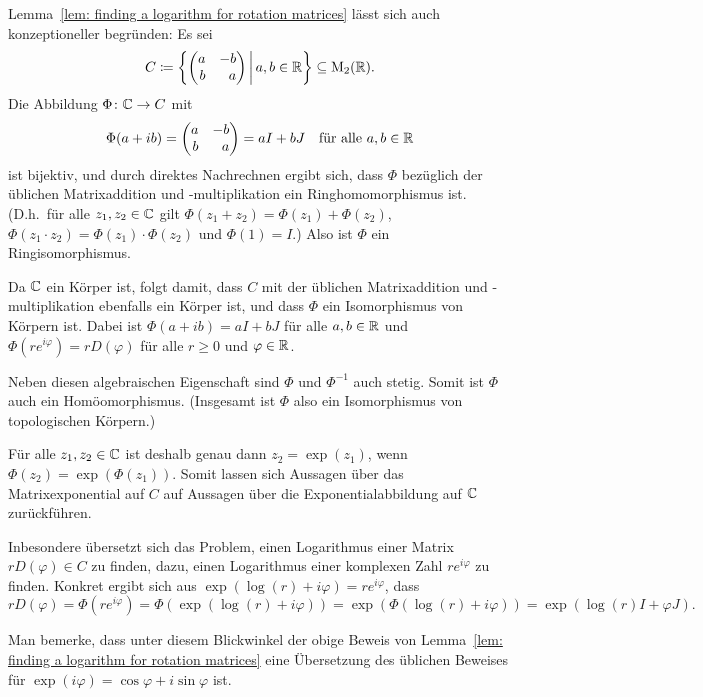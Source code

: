 \documentclass[a4paper, 10pt, numbers=noenddot]{scrartcl}
\begin{document}
\begin{remark}
  Lemma~\ref{lem: finding a logarithm for rotation matrices} lässt sich auch konzeptioneller begründen:
  Es sei
  \[
    C \coloneqq
    \left\{
      \begin{pmatrix*}[r]
        a & -b  \\
        b &  a
      \end{pmatrix*}
    \,\middle|\,
      a, b \in \Rbb
    \right\}
    \subseteq
    \Mat_2(\Rbb).
  \]
  Die Abbildung $\Phi \colon \mathbb{C} \to C$ mit
  \[
    \Phi(a + i b)
    =
    \begin{pmatrix*}[r]
      a & -b  \\
      b &  a
    \end{pmatrix*}
    =
    a I + b J
    \quad
    \text{für alle $a, b \in \Rbb$}
  \]
  ist bijektiv, und durch direktes Nachrechnen ergibt sich, dass $\Phi$ bezüglich der üblichen Matrixaddition und -multiplikation ein Ringhomomorphismus ist. (D.h.\ für alle $z_1, z_2 \in \mathbb{C}$ gilt $\Phi(z_1 + z_2) = \Phi(z_1) + \Phi(z_2)$, $\Phi(z_1 \cdot z_2) = \Phi(z_1) \cdot \Phi(z_2)$ und $\Phi(1) = I$.)
  Also ist $\Phi$ ein Ringisomorphismus.
  
  Da $\mathbb{C}$ ein Körper ist, folgt damit, dass $C$ mit der üblichen Matrixaddition und -multi\-pli\-ka\-ti\-on ebenfalls ein Körper ist, und dass $\Phi$ ein Isomorphismus von Körpern ist.
  Dabei ist $\Phi(a + ib) = a I + b J$ für alle $a, b \in \mathbb{R}$ und $\Phi(r e^{i\varphi}) = r D(\varphi)$ für alle $r \geq 0$ und $\varphi \in \mathbb{R}$.
  
  Neben diesen algebraischen Eigenschaft sind $\Phi$ und $\Phi^{-1}$ auch stetig.
  Somit ist $\Phi$ auch ein Homöomorphismus.
  (Insgesamt ist $\Phi$ also ein Isomorphismus von topologischen Körpern.)
  
  Für alle $z_1, z_2 \in \mathbb{C}$ ist deshalb genau dann $z_2 = \exp(z_1)$, wenn $\Phi(z_2) = \exp(\Phi(z_1))$.
  Somit lassen sich Aussagen über das Matrixexponential auf $C$ auf Aussagen über die Exponentialabbildung auf $\mathbb{C}$ zurückführen.
  
  Inbesondere übersetzt sich das Problem, einen Logarithmus einer Matrix $r D(\varphi) \in C$ zu finden, dazu, einen Logarithmus einer komplexen Zahl $r e^{i \varphi}$ zu finden.
  Konkret ergibt sich aus $\exp(\log(r) + i \varphi) = r e^{i \varphi}$, dass
  \[
      r D(\varphi)
    = \Phi(r e^{i \varphi})
    = \Phi(\exp(\log(r) + i \varphi))
    = \exp(\Phi(\log(r) + i \varphi))
    = \exp(\log(r) I + \varphi J).
  \]
  
  Man bemerke, dass unter diesem Blickwinkel der obige Beweis von Lemma~\ref{lem: finding a logarithm for rotation matrices} eine Übersetzung des üblichen Beweises für $\exp(i \varphi) = \cos\varphi + i \sin \varphi$ ist.
\end{remark}
\end{document}
